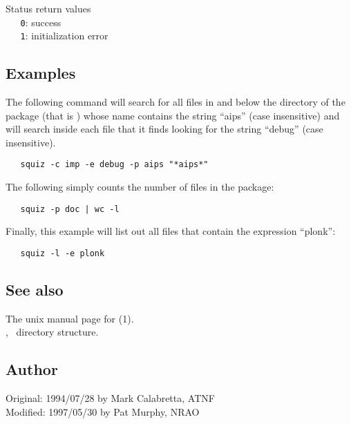 Status return values
\\ \verb+   0+:  success
\\ \verb+   1+:  initialization error

\subsection*{Examples}

The following command will search for all files in and below the
 directory of the  package (that is
) whose name contains the string ``aips'' (case
insensitive) and will search inside each file that it finds looking for the
string ``debug'' (case insensitive).

\begin{verbatim}
   squiz -c imp -e debug -p aips "*aips*"
\end{verbatim}

\noindent
The following simply counts the number of files in the  package:

\begin{verbatim}
   squiz -p doc | wc -l
\end{verbatim}

\noindent
Finally, this example will list out all files that contain the expression
``plonk'':

\begin{verbatim}
   squiz -l -e plonk
\end{verbatim}

\subsection*{See also}

The unix manual page for (1).\\
, \aipspp\ directory structure.

\subsection*{Author}

Original: 1994/07/28 by Mark Calabretta, ATNF\\
Modified: 1997/05/30 by Pat Murphy, NRAO


\newpage
\section{}
\label{tract}

